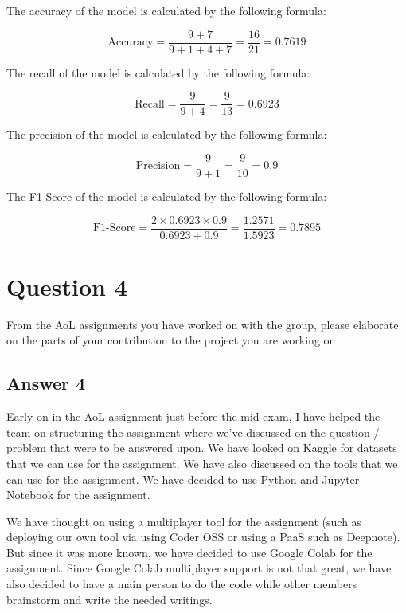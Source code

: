 \documentclass[
  11pt, %
]{assignment}
\begin{document}
The accuracy of the model is calculated by the following formula:

\begin{equation}
	\text{Accuracy} = \frac{9 + 7}{9 + 1 + 4 + 7} = \frac{16}{21} = 0.7619
\end{equation}

The recall of the model is calculated by the following formula:

\begin{equation}
	\text{Recall} = \frac{9}{9 + 4} = \frac{9}{13} = 0.6923
\end{equation}

The precision of the model is calculated by the following formula:

\begin{equation}
	\text{Precision} = \frac{9}{9 + 1} = \frac{9}{10} = 0.9
\end{equation}

The F1-Score of the model is calculated by the following formula:

\begin{equation}
	\text{F1-Score} = \frac{2 \times 0.6923 \times 0.9}{0.6923 + 0.9} = \frac{1.2571}{1.5923} = 0.7895
\end{equation}


\section*{Question 4}
\begin{problem}
From the AoL assignments you have worked on with the group, please elaborate on the parts of your contribution to the project you are working on
\end{problem}

\subsection*{Answer 4}

Early on in the AoL assignment just before the mid-exam, I have helped the team on structuring the assignment where we've discussed on the question / problem that were to be answered upon. We have looked on Kaggle for datasets that we can use for the assignment. We have also discussed on the tools that we can use for the assignment. We have decided to use Python and Jupyter Notebook for the assignment.

We have thought on using a multiplayer tool for the assignment (such as deploying our own tool via using Coder OSS or using a PaaS such as Deepnote). But since it was more known, we have decided to use Google Colab for the assignment. Since Google Colab multiplayer support is not that great, we have also decided to have a main person to do the code while other members brainstorm and write the needed writings.
\end{document}
